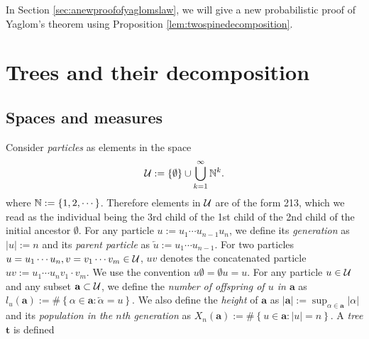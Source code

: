 \documentclass[12pt]{amsart}
\theoremstyle{remark}
\numberwithin{equation}{section}
\newcommand{\defn}[1]{{\em #1}}
\newcommand{\norm}[1]{\left\| #1 \right\|}
\newcommand{\abs}[1]{\left| #1 \right|}
\newcommand{\expr}[1]{\left( #1 \right)}
\newcommand{\set}[1]{\left\{ #1 \right\}}
\newcommand{\parent}[1]{\overleftarrow{#1}}
\newcommand{\tree}{\mathbf t}
\begin{document}
In Section \ref{sec:anewproofofyaglomslaw}, we will
give a new probabilistic proof of 
Yaglom's theorem using Proposition \ref{lem:twospinedecomposition}.
\section{Trees and their decomposition}
\label{sec:preliminary}
\subsection{Spaces and measures}
\label{sec:spacesandmeasures}
	Consider \defn{particles} as elements in the space
\begin{equation*}
		\cU
	:=
		\set{\emptyset}\cup\bigcup_{k=1}^\infty \bbN^k.
\end{equation*}
where $\mathbb N:=\{1,2,\cdots\}$. 
Therefore elements in $\mathcal U$ are of the form 213,
which we read as the individual being the 3rd child of the 1st child of 
the 2nd child of the initial ancestor $\emptyset$.
For any particle
$u:=u_1\cdots u_{n-1}u_n$, we
define its \defn{generation} as $\abs{u}:=n$ and its \defn{parent particle} as
$\parent{u}:=u_1\cdots u_{n-1}$.
For two particles $u=u_1\cdots u_n, v=v_1\cdots v_m\in\mathcal U$,
$uv$ denotes the concatenated particle $uv:=u_1\cdots u_nv_1\cdot v_m$.
We use the convention $u\emptyset = \emptyset u = u$.
For any particle $u\in\mathcal U$ and any subset $\mathbf a\subset\mathcal U$, 
we define the \defn{number of offspring of $u$ in $\mathbf a$}
as $l_u(\mathbf a) := \#\set{\alpha\in \mathbf a:\parent{\alpha}=u} $. 
We also define the \defn{height} of $\mathbf a$ as
$|\mathbf a|:=\sup_{\alpha\in \mathbf a}|\alpha|$ 
and its \defn{population in the $n$th generation} as $X_n(\mathbf a):=\#\set{u\in \mathbf a:|u|=n}$. 
A \defn{tree} $\tree$ is defined 
\end{document}
